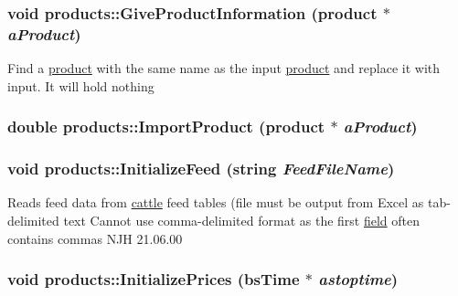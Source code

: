 \label{classproducts_af5ff2786f9e1eb1131408cd8d7bd6029}
\hypertarget{classproducts_a8bd239aabc0a167741c02882e305d65d}{
\subsubsection[{GiveProductInformation}]{\setlength{\rightskip}{0pt plus 5cm}void products::GiveProductInformation ({\bf product} $\ast$ {\em aProduct})}}
\label{classproducts_a8bd239aabc0a167741c02882e305d65d}
Find a \hyperlink{classproduct}{product} with the same name as the input \hyperlink{classproduct}{product} and replace it with input. It will hold nothing \hypertarget{classproducts_a054d0246f5e9cca276a7bc117c7fbfe5}{
\subsubsection[{ImportProduct}]{\setlength{\rightskip}{0pt plus 5cm}double products::ImportProduct ({\bf product} $\ast$ {\em aProduct})}}
\label{classproducts_a054d0246f5e9cca276a7bc117c7fbfe5}
\hypertarget{classproducts_a04c5d318238082bbdd59023d1e499af9}{
\subsubsection[{InitializeFeed}]{\setlength{\rightskip}{0pt plus 5cm}void products::InitializeFeed (string {\em FeedFileName})}}
\label{classproducts_a04c5d318238082bbdd59023d1e499af9}
Reads feed data from \hyperlink{classcattle}{cattle} feed tables (file must be output from Excel as tab-\/delimited text Cannot use comma-\/delimited format as the first \hyperlink{classfield}{field} often contains commas NJH 21.06.00 \hypertarget{classproducts_a5787b3bc5b31d226344648957a220079}{
\subsubsection[{InitializePrices}]{\setlength{\rightskip}{0pt plus 5cm}void products::InitializePrices ({\bf bsTime} $\ast$ {\em astoptime})}}
\label{classproducts_a5787b3bc5b31d226344648957a220079}
